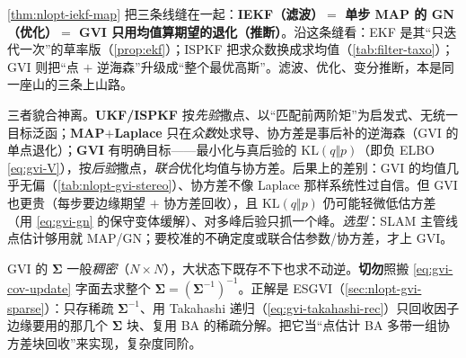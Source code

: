 \begin{insight}
\cref{thm:nlopt-iekf-map} 把三条线缝在一起：\textbf{IEKF（滤波）$=$ 单步 MAP 的 GN（优化）$=$ GVI 只用均值算期望的退化（推断）}。沿这条缝看：EKF 是其“只迭代一次”的草率版（\cref{prop:ekf}）；ISPKF 把求众数换成求均值（\cref{tab:filter-taxo}）；GVI 则把“点 $+$ 逆海森”升级成“整个最优高斯”。滤波、优化、变分推断，本是同一座山的三条上山路。
\end{insight}

\begin{pitfall}
三者貌合神离。\textbf{UKF/ISPKF} 按\emph{先验}撒点、以“匹配前两阶矩”为启发式、无统一目标泛函；\textbf{MAP$+$Laplace} 只在\emph{众数}处求导、协方差是事后补的逆海森（GVI 的单点退化）；\textbf{GVI} 有明确目标——最小化与真后验的 $\mathrm{KL}(q\Vert p)$（即负 ELBO \cref{eq:gvi-V}），按\emph{后验}撒点，\emph{联合}优化均值与协方差。后果上的差别：GVI 的均值几乎无偏（\cref{tab:nlopt-gvi-stereo}）、协方差不像 Laplace 那样系统性过自信。但 GVI 也更贵（每步要边缘期望 $+$ 协方差回收），且 $\mathrm{KL}(q\Vert p)$ 仍可能轻微低估方差（用 \cref{eq:gvi-gn} 的保守变体缓解）、对多峰后验只抓一个峰。\emph{选型}：SLAM 主管线点估计够用就 MAP/GN；要校准的不确定度或联合估参数/协方差，才上 GVI。
\end{pitfall}

\begin{pitfall}
GVI 的 $\boldsymbol{\Sigma}$ 一般\emph{稠密}（$N\times N$），大状态下既存不下也求不动逆。\textbf{切勿}照搬 \cref{eq:gvi-cov-update} 字面去求整个 $\boldsymbol{\Sigma}=(\boldsymbol{\Sigma}^{-1})^{-1}$。正解是 ESGVI（\cref{sec:nlopt-gvi-sparse}）：只存稀疏 $\boldsymbol{\Sigma}^{-1}$、用 Takahashi 递归（\cref{eq:gvi-takahashi-rec}）只回收因子边缘要用的那几个 $\boldsymbol{\Sigma}$ 块、复用 BA 的稀疏分解。把它当“点估计 BA 多带一组协方差块回收”来实现，复杂度同阶。
\end{pitfall}

